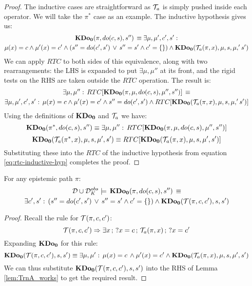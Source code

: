 \begin{proof}
The inductive cases are straightforward as $\mathcal{T}_{a}$ is simply pushed
inside each operator. We will take the $\pi^{*}$ case as an example.
The inductive hypothesis gives us:\begin{multline*}
\mathbf{KDo_{0}}(\pi,do(c,s),s'')\,\equiv\exists\mu,\mu',c',s':\\
\mu(x)=c\wedge\mu'(x)=c'\wedge\left(s''=do(c',s')\,\vee\, s''=s'\wedge c'=\{\}\right)\wedge\mathbf{KDo_{0}}(\mathcal{T}_{a}(\pi,x),\mu,s,\mu,'s')\end{multline*}
 We can apply $RTC$ to both sides of this equivalence, along with
two rearrangements: the LHS is expanded to put $\exists\mu,\mu''$
at its front, and the rigid tests on the RHS are taken outside the
$RTC$ operation. The result is:\begin{multline}
\exists\mu,\mu'':\, RTC[\mathbf{KDo_{0}}(\pi,\mu,do(c,s),\mu'',s'')]\,\equiv\\
\exists\mu,\mu',c',s':\,\mu(x)=c\wedge\mu'(x)=c'\wedge s''=do(c',s')\wedge RTC[\mathbf{KDo_{0}}(\mathcal{T}_{a}(\pi,x),\mu,s,\mu,'s')]\label{eq:rtc-inductive-hyp}\end{multline}
 Using the definitions of $\mathbf{KDo_{0}}$ and $\mathcal{T}_{a}$ we have:\[
\mathbf{KDo_{0}}(\pi^{*},do(c,s),s'')\equiv\exists\mu,\mu'':\, RTC[\mathbf{KDo_{0}}(\pi,\mu,do(c,s),\mu'',s'')]\]
 \[
\mathbf{KDo_{0}}(\mathcal{T}_{a}(\pi^{*},x),\mu,s,\mu',s')\equiv RTC[\mathbf{KDo_{0}}(\mathcal{T}_{a}(\pi,x),\mu,s,\mu',s')]\]
 Substituting these into the $RTC$ of the inductive hypothesis from
equation \eqref{eq:rtc-inductive-hyp} completes the proof. 
\end{proof}
\medskip{}


\begin{thmext}
[{{[}{{[}{\ref{thm:Trn-respects-epi-paths}}]}]}] For any epistemic
path $\pi$:\begin{multline*}
\mathcal{D}\cup\mathcal{D}_{K}^{obs}\models\,\mathbf{KDo_{0}}(\pi,do(c,s),s'')\,\equiv\\
\exists c',s':\,\left(s''=do(c',s')\,\vee\, s''=s'\wedge c'=\{\}\right)\wedge\mathbf{KDo_{0}}(\mathcal{T}(\pi,c,c'),s,s')\end{multline*}

\end{thmext}
\begin{proof}
Recall the rule for $\mathcal{T}(\pi,c,c')$:\[
\mathcal{T}(\pi,c,c')\Rightarrow\exists x\,;\,?x=c\,;\,\mathcal{T}_{a}(\pi,x)\,;\,?x=c'\]
 Expanding $\mathbf{KDo_{0}}$ for this rule:\[
\mathbf{KDo_{0}}(\mathcal{T}(\pi,c,c'),s,s')\equiv\exists\mu,\mu':\,\mu(x)=c\,\wedge\mu'(x)=c'\wedge\mathbf{KDo_{0}}(\mathcal{T}_{a}(\pi,x),\mu,s,\mu',s')\]
 We can thus substitute $\mathbf{KDo_{0}}(\mathcal{T}(\pi,c,c'),s,s')$ into the RHS
of Lemma \ref{lem:TrnA_works} to get the required result. 
\end{proof}
\medskip{}


